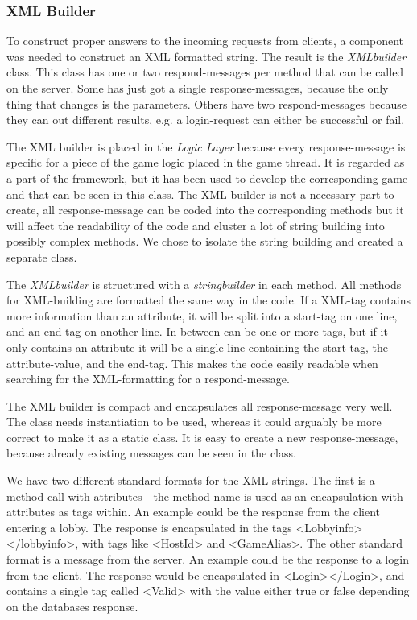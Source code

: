 \subsubsection{XML Builder} \label{sec:xmlbuilderimpl}
To construct proper answers to the incoming requests from clients, a component was needed to construct an XML formatted string. The result is the \textit{XMLbuilder} class. This class has one or two respond-messages per method that can be called on the server. Some has just got a single response-messages, because the only thing that changes is the parameters. Others have two respond-messages because they can out different results, e.g. a login-request can either be successful or fail. 

The XML builder is placed in the \textit{Logic Layer} because every response-message is specific for a piece of the game logic placed in the game thread. It is regarded as a part of the framework, but it has been used to develop the corresponding game and that can be seen in this class. The XML builder is not a necessary part to create, all response-message can be coded into the corresponding methods but it will affect the readability of the code and cluster a lot of string building into possibly complex methods. We chose to isolate the string building and created a separate class.

The \textit{XMLbuilder} is structured with a \textit{stringbuilder} in each method. All methods for XML-building are formatted the same way in the code. If a XML-tag contains more information than an attribute, it will be split into a start-tag on one line, and an end-tag on another line. In between can be one or more tags, but if it only contains an attribute it will be a single line containing the start-tag, the attribute-value, and the end-tag. This makes the code easily readable when searching for the XML-formatting for a respond-message. 

The XML builder is compact and encapsulates all response-message very well. The class needs instantiation to be used, whereas it could arguably be more correct to make it as a static class. It is easy to create a new response-message, because already existing messages can be seen in the class.

We have two different standard formats for the XML strings. The first is a method call with attributes - the method name is used as an encapsulation with attributes as tags within. An example could be the response from the client entering a lobby. The response is encapsulated in the tags <Lobbyinfo></lobbyinfo>, with tags like <HostId> and <GameAlias>. The other standard format is a message from the server. An example could be the response to a login from the client. The response would be encapsulated in <Login></Login>, and contains a single tag called <Valid> with the value either true or false depending on the databases response.
